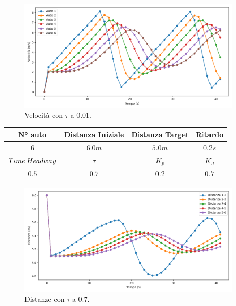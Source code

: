 \begin{figure}[H]
    \includegraphics[width=0.96\textwidth]{images/5-experiment/tau/velocity_0,01.png}
    \caption{Velocità con $\tau$ a $0.01$.}
    \label{fig:0.01-tau-velocity}
\end{figure}
\vspace*{\fill}
\newpage
\vspace*{\fill}
\begin{table}[h]
    \centering
    \begin{tabular}{|c|c|c|c|}
        \hline
        N° auto & Distanza Iniziale & Distanza Target & Ritardo \\
        \hline
        $6$ & $6.0 m$ & $5.0 m$ & $0.2 s$ \\
        \hline
        $Time\hspace{0.2em}Headway$ & $\tau$ & $K_p$ & $K_d$  \\
        \hline
        $0.5$ & $0.7$ & $0.2$ & $0.7$ \\
        \hline
    \end{tabular}
\end{table}
\begin{figure}[H]
    \includegraphics[width=0.96\textwidth]{images/5-experiment/tau/distance_0,7.png}
    \caption{Distanze con $\tau$ a $0.7$.}
    \label{fig:0.7-tau-distance}
\end{figure}

